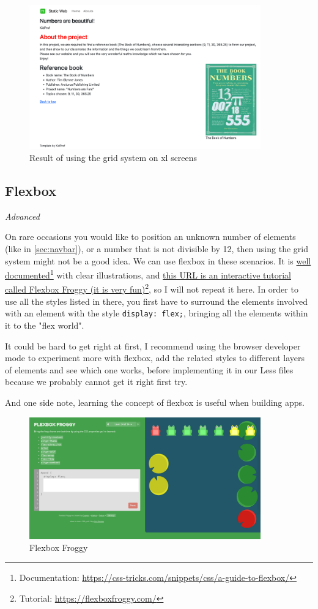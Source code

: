 \begin{figure}[H]
\centering
\includegraphics[width=10cm]{images/chn6-grid-xl.png}
\caption{Result of using the grid system on xl screens}
\end{figure}

\subsection{Flexbox}
\label{sec:flexbox}

\textit{Advanced}
\vspace{6mm}

On rare occasions you would like to position an unknown number of elements (like in \cref{sec:navbar}), or a number that is not divisible by 12, then using the grid system might not be a good idea. We can use flexbox in these scenarios. It is \href{https://css-tricks.com/snippets/css/a-guide-to-flexbox/}{well documented}\footnote{Documentation: \url{https://css-tricks.com/snippets/css/a-guide-to-flexbox/}} with clear illustrations, and \href{https://flexboxfroggy.com/}{this URL is an interactive tutorial called Flexbox Froggy (it is very fun)}\footnote{Tutorial: \url{https://flexboxfroggy.com/}}, so I will not repeat it here. In order to use all the styles listed in there, you first have to surround the elements involved with an element with the style \texttt{display: flex;}, bringing all the elements within it to the "flex world".

It could be hard to get right at first, I recommend using the browser developer mode to experiment more with flexbox, add the related styles to different layers of elements and see which one works, before implementing it in our Less files because we probably cannot get it right first try.

And one side note, learning the concept of flexbox is useful when building apps.

\begin{figure}[h]
\centering
\includegraphics[width=10cm]{images/chn6-flexboxfroggy.png}
\caption{Flexbox Froggy}
\end{figure}

